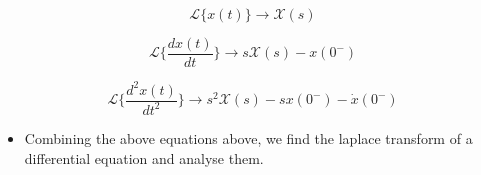 \documentclass[10pt,a4paper]{article}
\providecommand{\tightlist}{%
      \setlength{\itemsep}{0pt}\setlength{\parskip}{0pt}}
\begin{document}
\begin{equation}
    \mathscr{L}\{x(t)\} \to \mathcal{X}(s)
\end{equation}

\begin{equation}
    \mathscr{L}\{\frac{dx(t)}{dt}\} \to s\mathcal{X}(s)-x(0^{-})
\end{equation}

\begin{equation}
    \mathscr{L}\{\frac{d^{2}x(t)}{dt^{2}}\} \to s^{2}\mathcal{X}(s)-sx(0^{-})-\dot x(0^{-})
\end{equation}

\begin{itemize}
\tightlist
\item
  Combining the above equations above, we find the laplace transform of
  a differential equation and analyse them.
\end{itemize}
\end{document}
